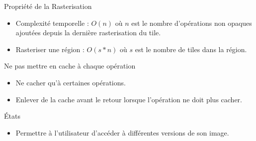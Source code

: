 \documentclass[slidetop,compress,mathserif]{beamer}
\begin{document}
	\begin{frame}{Propriété de la Rasterisation}
		\begin{itemize}
		\item Complexité temporelle : $O(n)$ où $n$ est le nombre d'opérations
		non opaques
		ajoutées depuis la dernière rasterisation du tile.
		\item Rasteriser une région : $O(s*n)$ où $s$ est le nombre de tiles dans la région.
		\end{itemize}
	\end{frame}
	\begin{frame}{Ne pas mettre en cache à chaque opération}
		\begin{itemize}
			\item Ne cacher qu'à certaines opérations.
			\item Enlever de la cache avant le retour 
			lorsque l'opération ne doit plus cacher.
		\end{itemize}
	\end{frame}
	\begin{frame}{États}
		\begin{itemize}
			\item Permettre à l'utilisateur d'accéder à différentes 
			versions de son image.
		\end{itemize}
	\end{frame}
		
\end{document}

